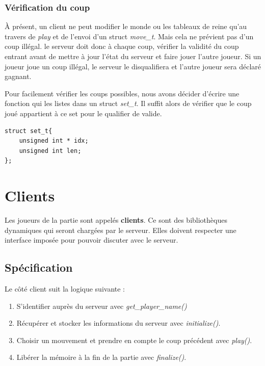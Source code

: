 \documentclass{article}
\begin{document}
\subsubsection{Vérification du coup}
\label{secumove}
À présent, un client ne peut modifier le monde ou les tableaux de reine qu'au travers de \textit{play} et de l'envoi d'un struct \textit{move\_t}. Mais cela ne prévient pas d'un coup illégal. le serveur doit donc à chaque coup, vérifier la validité du coup entrant avant de mettre à jour l'état du serveur et faire jouer l'autre joueur. Si un joueur joue un coup illégal, le serveur le disqualifiera et l'autre joueur sera déclaré gagnant.
\vspace{0.5cm}

Pour facilement vérifier les coups possibles, nous avons décider d'écrire une fonction qui les listes dans un struct \textit{set\_t}. Il suffit alors de vérifier que le coup joué appartient à ce set pour le qualifier de valide.
\vspace{0.5cm}

\begin{lstlisting}
struct set_t{
    unsigned int * idx;
    unsigned int len;
};
\end{lstlisting}

\newpage
\section{Clients}
\label{client}

Les joueurs de la partie sont appelés \textbf{clients}. Ce sont des bibliothèques dynamiques qui seront chargées par le serveur. Elles doivent respecter une interface imposée pour pouvoir discuter avec le serveur. 

\subsection{Spécification}
\label{specclient}

Le côté client suit la logique suivante :
\begin{enumerate}
    \item  S'identifier auprès du serveur avec \textit{get\_player\_name()}
    \item Récupérer et stocker les informations du serveur avec  \textit{initialize()}.
    \item Choisir un mouvement et prendre en compte le coup précédent avec \textit{play()}.
    \item Libérer la mémoire à la fin de la partie avec \textit{finalize()}.
\end{enumerate}
\end{document}

